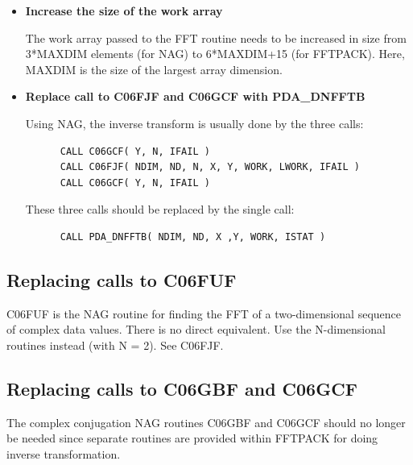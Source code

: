 \documentclass[11pt,twoside]{article}
\newcommand{\htmlref}[2]{#1}
\newcommand{\xlabel}[1]{}
\begin{document}
\begin{itemize}

\item{\bf Increase the size of the work array}

   The work array passed to the FFT routine needs to be increased in
   size from 3*MAXDIM elements (for NAG) to 6*MAXDIM+15 (for FFTPACK).
   Here, MAXDIM is the size of the largest array dimension.

\item{\bf Replace call to C06FJF and C06GCF with
\htmlref{PDA\_DNFFTB}{PDA\_NFFTB}}

   Using NAG, the inverse transform is usually done by the three calls:

\begin{verbatim}
      CALL C06GCF( Y, N, IFAIL )
      CALL C06FJF( NDIM, ND, N, X, Y, WORK, LWORK, IFAIL )
      CALL C06GCF( Y, N, IFAIL )
\end{verbatim}

   These three calls should be replaced by the single call:

\begin{verbatim}
      CALL PDA_DNFFTB( NDIM, ND, X ,Y, WORK, ISTAT )
\end{verbatim}

\end{itemize}


\subsection{\xlabel{replacing_calls_to_c06fuf}Replacing calls to C06FUF}

   C06FUF is the NAG routine for finding the FFT of a two-dimensional
   sequence of complex data values. There is no direct equivalent. Use
   the N-dimensional routines instead (with N = 2). See
\htmlref{C06FJF.}{m_c06fjf}


\subsection{\xlabel{replacing_calls_to_c06gbf_and_c06gcf}Replacing calls to C06GBF and C06GCF}

   The complex conjugation NAG routines C06GBF and C06GCF should no
   longer be needed since separate routines are provided within FFTPACK
   for doing inverse transformation.
\end{document}
